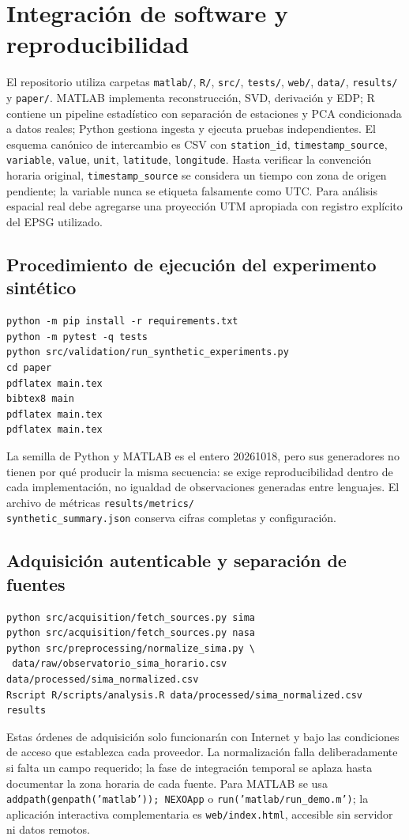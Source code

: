 \section{Integración de software y reproducibilidad}\label{sec:software}
El repositorio utiliza carpetas \texttt{matlab/}, \texttt{R/}, \texttt{src/}, \texttt{tests/}, \texttt{web/}, \texttt{data/}, \texttt{results/} y \texttt{paper/}. MATLAB implementa reconstrucción, SVD, derivación y EDP; R contiene un pipeline estadístico con separación de estaciones y PCA condicionada a datos reales; Python gestiona ingesta y ejecuta pruebas independientes. El esquema canónico de intercambio es CSV con \texttt{station\_id}, \texttt{timestamp\_source}, \texttt{variable}, \texttt{value}, \texttt{unit}, \texttt{latitude}, \texttt{longitude}. Hasta verificar la convención horaria original, \texttt{timestamp\_source} se considera un tiempo con zona de origen pendiente; la variable nunca se etiqueta falsamente como UTC. Para análisis espacial real debe agregarse una proyección UTM apropiada con registro explícito del EPSG utilizado.

\subsection{Procedimiento de ejecución del experimento sintético}
\begin{verbatim}
python -m pip install -r requirements.txt
python -m pytest -q tests
python src/validation/run_synthetic_experiments.py
cd paper
pdflatex main.tex
bibtex8 main
pdflatex main.tex
pdflatex main.tex
\end{verbatim}
La semilla de Python y MATLAB es el entero 20261018, pero sus generadores no tienen por qué producir la misma secuencia: se exige reproducibilidad dentro de cada implementación, no igualdad de observaciones generadas entre lenguajes. El archivo de métricas \texttt{results/metrics/}\\\texttt{synthetic\_summary.json} conserva cifras completas y configuración.

\subsection{Adquisición autenticable y separación de fuentes}
\begin{verbatim}
python src/acquisition/fetch_sources.py sima
python src/acquisition/fetch_sources.py nasa
python src/preprocessing/normalize_sima.py \
 data/raw/observatorio_sima_horario.csv data/processed/sima_normalized.csv
Rscript R/scripts/analysis.R data/processed/sima_normalized.csv results
\end{verbatim}
Estas órdenes de adquisición solo funcionarán con Internet y bajo las condiciones de acceso que establezca cada proveedor. La normalización falla deliberadamente si falta un campo requerido; la fase de integración temporal se aplaza hasta documentar la zona horaria de cada fuente. Para MATLAB se usa \texttt{addpath(genpath('matlab')); NEXOApp} o \texttt{run('matlab/run\_demo.m')}; la aplicación interactiva complementaria es \texttt{web/index.html}, accesible sin servidor ni datos remotos.

